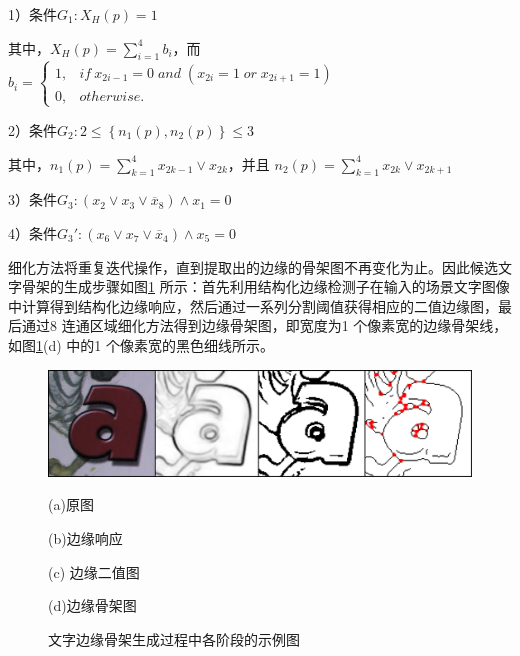         1）条件$G_1: X_H(p)=1$

        其中，$X_H(p)=\sum\limits_{i=1}^4b_i$，而
        $b_i=\left\{
        \begin{array}{cl}
        1, &  if \ x_{2i-1}=0 \; and \; (x_{2i}=1 \; or \; x_{2i+1}=1)\\
        0, &  otherwise.
        \end{array}
        \right.$

        2）条件$G_2: 2\le \left\{n_1(p),n_2(p)\right\} \le3$

        其中，$n_1(p)=\sum\limits_{k=1}^4x_{2k-1}\lor x_{2k}$，并且
        $n_2(p)=\sum\limits_{k=1}^4x_{2k} \lor x_{2k+1}$

        3）条件$G_3: (x_2 \lor x_3 \lor \overline{x}_8) \land x_1=0$

        4）条件$G_3$$'$$: (x_6 \lor x_7 \lor \overline{x}_4) \land x_5=0$

        细化方法将重复迭代操作，直到提取出的边缘的骨架图不再变化为止。因此候选文字骨架的生成步骤如图\ref{fig.c3_skeleton} 所示：首先利用结构化边缘检测子在输入的场景文字图像中计算得到结构化边缘响应，然后通过一系列分割阈值获得相应的二值边缘图，最后通过8 连通区域细化方法得到边缘骨架图，即宽度为1 个像素宽的边缘骨架线，如图\ref{fig.c3_skeleton}(d) 中的1 个像素宽的黑色细线所示。

        \begin{figure}[!h]
        \centering
        \includegraphics[width=\textwidth]{./figures/c3_skeleton.jpg}
        \begin{minipage}[t]{0.24\linewidth}
        \centerline{\small (a)原图}
        \end{minipage}
        \begin{minipage}[t]{0.24\linewidth}
        \centerline{\small (b)边缘响应}
        \end{minipage}
        \begin{minipage}[t]{0.24\linewidth}
        \centerline{\small(c) 边缘二值图}
        \end{minipage}
        \begin{minipage}[t]{0.24\linewidth}
        \centerline{\small (d)边缘骨架图}
        \end{minipage}
        \caption{文字边缘骨架生成过程中各阶段的示例图}
        \label{fig.c3_skeleton}
        \end{figure}

